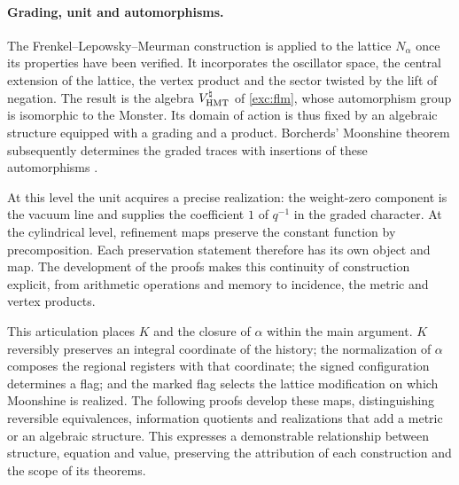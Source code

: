\paragraph{Grading, unit and automorphisms.}
\label{inc-ampl-automorfismos}
The Frenkel--Lepowsky--Meurman construction is applied to the lattice
$N_\alpha$ once its properties have been verified. It incorporates the
oscillator space, the central extension of the lattice, the vertex product
and the sector twisted by the lift of negation. The result is
the algebra $V^\natural_{\rm HMT}$ of \eqref{exc:flm}, whose
automorphism group is isomorphic to the Monster. Its domain of action is thus
fixed by an algebraic structure equipped with a grading and a product. Borcherds'
Moonshine theorem subsequently determines the graded traces
with insertions of these automorphisms \cite{flm,borcherds}.

At this level the unit acquires a precise realization: the weight-zero
component is the vacuum line and supplies the coefficient $1$ of
$q^{-1}$ in the graded character. At the cylindrical level,
refinement maps preserve the constant function by
precomposition. Each preservation statement therefore has its own
object and map. The development of the proofs makes this
continuity of construction explicit, from arithmetic operations and
memory to incidence, the metric and vertex products.

This articulation places $K$ and the closure of $\alpha$ within the main
argument. $K$ reversibly preserves an integral coordinate of the
history; the normalization of $\alpha$ composes the regional registers
with that coordinate; the signed configuration determines a flag; and
the marked flag selects the lattice modification on which
Moonshine is realized. The following proofs develop these
maps, distinguishing reversible equivalences, information
quotients and realizations that add a metric or an algebraic
structure. This expresses a demonstrable relationship between structure,
equation and value, preserving the attribution of each construction and the
scope of its theorems.
